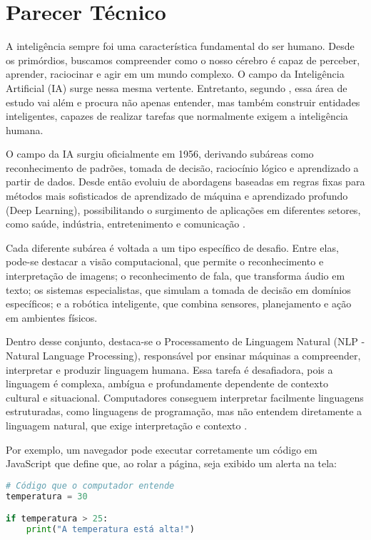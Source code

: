 \chapter{Parecer Técnico} \label{cha:parecertecnico}

A inteligência sempre foi uma característica fundamental do ser humano. Desde os primórdios, buscamos compreender como o nosso cérebro é capaz de perceber, aprender, raciocinar e agir em um mundo complexo. O campo da Inteligência Artificial (IA) surge nessa mesma vertente. Entretanto, segundo \textcite{russell2022}, essa área de estudo vai além e procura não apenas entender, mas também construir entidades inteligentes, capazes de realizar tarefas que normalmente exigem a inteligência humana.

O campo da IA surgiu oficialmente em 1956, derivando subáreas como reconhecimento de padrões, tomada de decisão, raciocínio lógico e aprendizado a partir de dados. Desde então evoluiu de abordagens baseadas em regras fixas para métodos mais sofisticados de aprendizado de máquina e aprendizado profundo (Deep Learning), possibilitando o surgimento de aplicações em diferentes setores, como saúde, indústria, entretenimento e comunicação \cite{nilsson2010quest}.


Cada diferente subárea é  voltada a um tipo específico de desafio. Entre elas, pode-se destacar a visão computacional, que permite o reconhecimento e interpretação de imagens; o reconhecimento de fala, que transforma áudio em texto; os sistemas especialistas, que simulam a tomada de decisão em domínios específicos; e a robótica inteligente, que combina sensores, planejamento e ação em ambientes físicos.


Dentro desse conjunto, destaca-se o Processamento de Linguagem Natural (NLP - Natural Language Processing), responsável por ensinar máquinas a compreender, interpretar e produzir linguagem humana. Essa tarefa é desafiadora, pois a linguagem é complexa, ambígua e profundamente dependente de contexto cultural e situacional. Computadores conseguem interpretar facilmente linguagens estruturadas, como linguagens de programação, mas não entendem diretamente a linguagem natural, que exige interpretação e contexto \cite{russell2022}.

Por exemplo, um navegador pode executar corretamente um código em JavaScript que define que, ao rolar a página, seja exibido um alerta na tela:
\begin{lstlisting}[language=Python, style=input]
# Código que o computador entende
temperatura = 30

if temperatura > 25:
    print("A temperatura está alta!")
\end{lstlisting}

